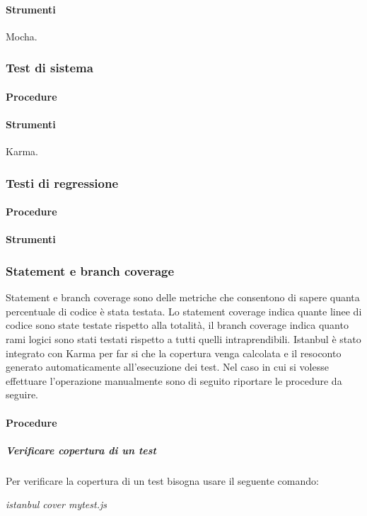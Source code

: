 \paragraph{Strumenti}
Mocha.

\subsubsection{Test di sistema}

\paragraph{Procedure}

\paragraph{Strumenti}
Karma.

\subsubsection{Testi di regressione}

\paragraph{Procedure}

\paragraph{Strumenti}

\subsubsection{Statement e branch coverage}
Statement e branch coverage sono delle metriche che consentono di sapere quanta percentuale di codice è stata testata.
Lo statement coverage indica quante linee di codice sono state testate rispetto alla totalità, il branch coverage indica quanto rami logici sono stati testati rispetto a tutti quelli intraprendibili.
Istanbul è stato integrato con Karma per far si che la copertura venga calcolata e il resoconto generato automaticamente all'esecuzione dei test.
Nel caso in cui si volesse effettuare l'operazione manualmente sono di seguito riportare le procedure da seguire.
\paragraph{Procedure}
\subparagraph{Verificare copertura di un test}
Per verificare la copertura di un test bisogna usare il seguente comando:\\
\begin{center}
\textit{istanbul cover mytest.js}\\
\end{center}


